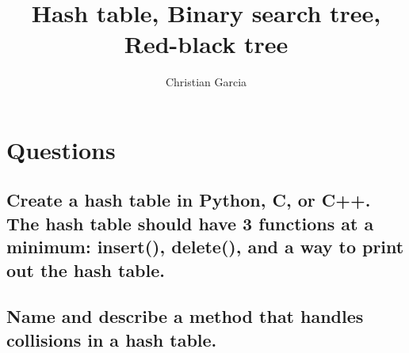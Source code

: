 \documentclass{article}
\title{Hash table, Binary search tree, Red-black tree}
\author{Christian Garcia}
\begin{document}
\maketitle

\section*{Questions}

\subsection{Create a hash table in Python, C, or C++. The hash table should have 3 functions at a minimum: insert(), delete(), and a way to print out the hash table.}


\vspace{144pt}

\subsection{Name and describe a method that handles collisions in a hash table.}
\end{document}
